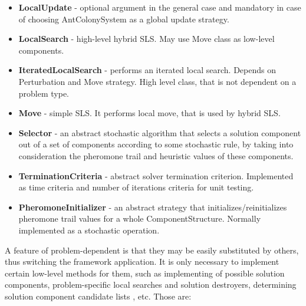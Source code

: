 \documentclass[12pt,a4paper,oneside]{book}
\begin{document}
\begin{itemize}
\item \textbf{LocalUpdate} - optional argument in the general case and mandatory in case of choosing AntColonySystem as a global update strategy.

\item \textbf{LocalSearch} - high-level hybrid SLS. May use Move class as low-level components.

\item \textbf{IteratedLocalSearch} - performs an iterated local search. Depends on Perturbation and Move strategy. High level class, that is not dependent on a problem type.

\item \textbf{Move} - simple SLS. It performs local move, that is used by hybrid SLS.

\item \textbf{Selector} - an abstract stochastic algorithm that selects a solution component out of a set of components according to some stochastic rule, by taking into consideration the pheromone trail and heuristic values of these components.

\item \textbf{TerminationCriteria} - abstract solver termination criterion. Implemented as time criteria and number of iterations criteria for unit testing.

\item \textbf{PheromoneInitializer} - an abstract strategy that initializes/reinitializes pheromone trail values for a whole ComponentStructure. Normally implemented as a stochastic operation.

\end{itemize}

A feature of problem-dependent is that they may be easily substituted by others, thus switching the framework application. It is only necessary to implement certain low-level methods for them, such as implementing of possible solution components, problem-specific local searches and solution destroyers, determining solution component candidate lists , etc. Those are:
\end{document}
